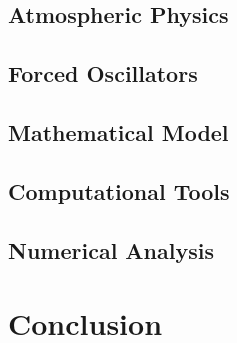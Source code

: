 \documentclass{report}
\begin{document}
    \section{Atmospheric Physics}

    \section{Forced Oscillators}

    \section{Mathematical Model}

    \section{Computational Tools}

    \section{Numerical Analysis}

\chapter{Conclusion}

\newpage

\printbibliography
\end{document}
